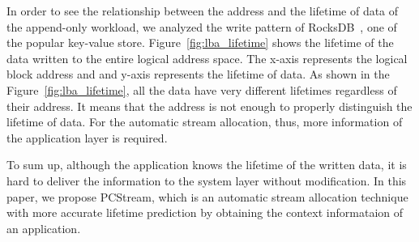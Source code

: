 In order to see the relationship between the address and the lifetime of data of the append-only workload,
we analyzed the write pattern of RocksDB~\cite{RocksDB}, one of the popular key-value store.
Figure~\ref{fig:lba_lifetime} shows the lifetime of the data written to the entire logical address space.
The x-axis represents the logical block address and 
and y-axis represents the lifetime of data.
As shown in the Figure~\ref{fig:lba_lifetime}, all the data have very different lifetimes regardless of their 
address.
It means that the address is not enough to properly distinguish the lifetime of data.
For the automatic stream allocation, thus, more information of the application layer is required.


To sum up, although the application knows the lifetime of the written data, it is hard to 
deliver the information to the system layer without modification.
In this paper, we propose PCStream, which is an automatic stream allocation technique with
more accurate lifetime prediction by obtaining the context informataion of an application.

